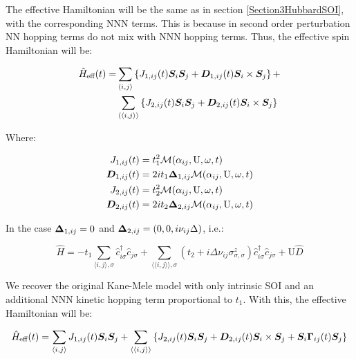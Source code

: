 The effective Hamiltonian will be the same as in section \ref{Section3HubbardSOI}, with the corresponding NNN terms. This is because in second order perturbation NN hopping terms do not mix with NNN hopping terms. Thus, the effective spin Hamiltonian will be:

\begin{align}
\hat{H}_{\text{eff}}(t) = &\sum_{\langle i,j \rangle} \left\{ J_{1,ij}(t)\boldsymbol{S}_i\boldsymbol{S}_j + \boldsymbol{D}_{1,ij}(t) \boldsymbol{S}_i \times \boldsymbol{S}_j \right\} + \nonumber \\
&\sum_{\langle \langle i,j \rangle \rangle} \left\{ J_{2,ij}(t)\boldsymbol{S}_i\boldsymbol{S}_j + \boldsymbol{D}_{2,ij}(t) \boldsymbol{S}_i \times \boldsymbol{S}_j \right\}
\end{align}

Where:

\begin{align*}
J_{1,ij}(t) &= t_1^2\mathcal{M}(\alpha_{ij}, \text{U}, \omega, t) \\
\boldsymbol{D}_{1,ij}(t) &= 2it_1 \boldsymbol{\Delta}_{1,ij}\mathcal{M}(\alpha_{ij}, \text{U}, \omega, t) \\
J_{2,ij}(t) &= t_2^2\mathcal{M}(\alpha_{ij}, \text{U}, \omega, t) \\
\boldsymbol{D}_{2,ij}(t) &= 2it_2 \boldsymbol{\Delta}_{2,ij}\mathcal{M}(\alpha_{ij}, \text{U}, \omega, t)
\end{align*}

In the case $\boldsymbol{\Delta}_{1,ij} = 0$ and $\boldsymbol{\Delta}_{2,ij} = (0, 0, i \nu_{ij} \Delta)$, i.e.:

\begin{equation}
\hat{H} = - t_1\sum_{\langle i,j \rangle, \sigma} \hat{c}_{i \sigma}^\dagger \hat{c}_{j \sigma} + 
	\sum_{\langle \langle i,j \rangle \rangle, \sigma}(t_2 + i\Delta\nu_{ij}\sigma^z_{\sigma, \sigma})\hat{c}_{i \sigma}^\dagger \hat{c}_{j \sigma} + 
	\text{U}\hat{D}
\end{equation}

We recover the original Kane-Mele model with only intrinsic SOI and an additional NNN kinetic hopping term proportional to $t_1$. With this, the effective Hamiltonian will be:

\begin{equation}
\label{OtherHamsSpinModel}
\hat{H}_{\text{eff}}(t) = \sum_{\langle i,j \rangle} J_{1,ij}(t)\boldsymbol{S}_i\boldsymbol{S}_j + \sum_{\langle \langle i,j \rangle \rangle} \left\{ J_{2,ij}(t)\boldsymbol{S}_i\boldsymbol{S}_j + \boldsymbol{D}_{2,ij}(t) \boldsymbol{S}_i \times \boldsymbol{S}_j + \boldsymbol{S}_i \boldsymbol{\Gamma}_{ij}(t) \boldsymbol{S}_j \right\}
\end{equation}

